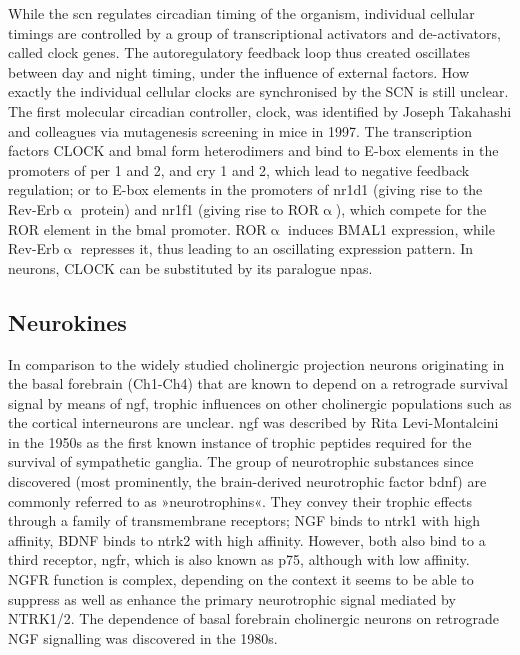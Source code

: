 While the \ac{scn} regulates circadian timing of the organism, individual cellular timings are controlled by a group of transcriptional activators and de-activators, called clock genes. The autoregulatory feedback loop thus created oscillates between day and night timing, under the influence of external factors. How exactly the individual cellular clocks are synchronised by the SCN is still unclear.\cite{Balsalobre2002} The first molecular circadian controller, \ac{clock}, was identified by Joseph Takahashi and colleagues via mutagenesis screening in mice in 1997.\cite{King1997} The transcription factors CLOCK and \ac{bmal} form heterodimers and bind to E-box elements in the promoters of \ac{per} 1 and 2, and \ac{cry} 1 and 2, which lead to negative feedback regulation; or to E-box elements in the promoters of \acs{nr1d1} (giving rise to the Rev-Erb$\upalpha$ protein) and \acs{nr1f1} (giving rise to ROR$\upalpha$), which compete for the ROR element in the \ac{bmal} promoter. ROR$\upalpha$ induces BMAL1 expression, while Rev-Erb$\upalpha$ represses it, thus leading to an oscillating expression pattern. In neurons, CLOCK can be substituted by its paralogue \acs{npas}.

\subsection{Neurokines} \label{sec:intro:neurokine}
In comparison to the widely studied cholinergic projection neurons originating in the basal forebrain (Ch1-Ch4) that are known to depend on a retrograde survival signal by means of \ac{ngf}, trophic influences on other cholinergic populations such as the cortical interneurons are unclear.  \ac{ngf} was described by Rita Levi-Montalcini in the 1950s as the first known instance of trophic peptides required for the survival of sympathetic ganglia.\cite{Levi-Montalcini1960} The group of neurotrophic substances since discovered (most prominently, the brain-derived neurotrophic factor \acs{bdnf}) are commonly referred to as »neurotrophins«. They convey their trophic effects through a family of transmembrane receptors; NGF binds to \ac{ntrk1} with high affinity, BDNF binds to \ac{ntrk2} with high affinity. However, both also bind to a third receptor, \ac{ngfr}, which is also known as p75, although with low affinity. NGFR function is complex, depending on the context it seems to be able to suppress as well as enhance the primary neurotrophic signal mediated by NTRK1/2.\cite{} The dependence of basal forebrain cholinergic neurons on retrograde NGF signalling was discovered in the 1980s.\cite{Hefti1986}

